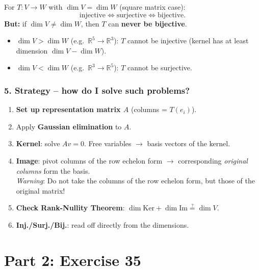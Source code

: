 \documentclass[a4paper,12pt]{article}
\begin{document}
\begin{merkbox}[title={Important consequence}]
For $T \colon V \to W$ with $\dim V = \dim W$ (square matrix case):
\[
\text{injective} \iff \text{surjective} \iff \text{bijective}.
\]
\textbf{But:} if $\dim V \neq \dim W$, then $T$ can \textbf{never be bijective}.
\begin{itemize}[nosep]
    \item $\dim V > \dim W$ (e.g.\ $\mathbb{R}^5 \to \mathbb{R}^3$): $T$ cannot be injective (kernel has at least dimension $\dim V - \dim W$).
    \item $\dim V < \dim W$ (e.g.\ $\mathbb{R}^3 \to \mathbb{R}^5$): $T$ cannot be surjective.
\end{itemize}
\end{merkbox}

\section*{5. Strategy -- how do I solve such problems?}

\begin{merkbox}[title={Recipe}]
\begin{enumerate}[nosep]
    \item \textbf{Set up representation matrix $A$} (columns = $T(e_i)$).
    \item Apply \textbf{Gaussian elimination} to $A$.
    \item \textbf{Kernel}: solve $Av = 0$. Free variables $\to$ basis vectors of the kernel.
    \item \textbf{Image}: pivot columns of the row echelon form $\to$ corresponding \emph{original columns} form the basis. \\
    \emph{Warning}: Do not take the columns of the row echelon form, but those of the original matrix!
    \item \textbf{Check Rank-Nullity Theorem}: $\dim \text{Ker} + \dim \text{Im} \stackrel{?}{=} \dim V$.
    \item \textbf{Inj./Surj./Bij.}: read off directly from the dimensions.
\end{enumerate}
\end{merkbox}

\newpage

\part*{Part 2: Exercise 35}
\end{document}
